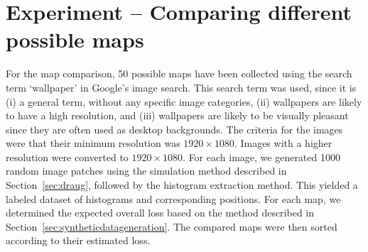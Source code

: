 \section{Experiment -- Comparing different possible maps}

For the map comparison, 50 possible maps have been collected using the
search term `wallpaper' in Google's image search. This search term was
used, since it is (i) a general term, without any specific image
categories, (ii) wallpapers are likely to have a high resolution, and
(iii) wallpapers are likely to be visually pleasant since they
are often used as desktop backgrounds. The criteria for the images were that
their minimum resolution was $1920 \times 1080$. Images with a higher
resolution were converted to $1920 \times 1080$.  For each image, we
generated 1000 random image patches using the simulation method
described in Section~\ref{sec:draug}, followed by the histogram
extraction method. This yielded a labeled dataset of histograms and
corresponding positions. For each map, we determined the expected
overall loss based on the method described in
Section~\ref{sec:syntheticdatageneration}. The compared maps were then sorted
according to their estimated loss.


